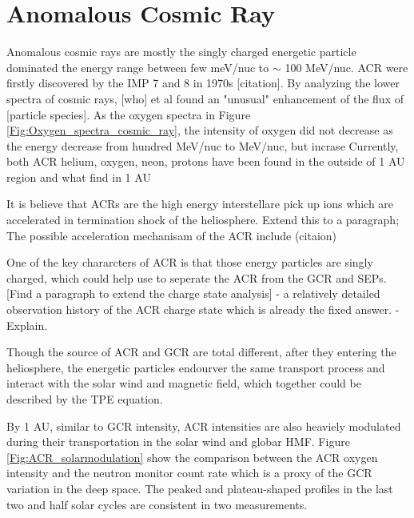 	


\section{Anomalous Cosmic Ray}

Anomalous cosmic rays are mostly the singly charged energetic particle dominated the energy range between few meV/nuc to $\sim$ 100 MeV/nuc. \acs{ACR} were firstly discovered by the \acs{IMP} 7 and 8 in 1970s [citation]. By analyzing the lower spectra of cosmic rays, [who] et al found an "unusual" enhancement of the flux of [particle species]. As the oxygen spectra in Figure \ref{Fig:Oxygen_spectra_cosmic_ray}, the intensity of oxygen did not decrease as the energy decrease from hundred MeV/nuc to MeV/nuc, but incrase
Currently, both ACR helium, oxygen, neon, protons have been found in the outside of 1 AU region and what find in 1 AU

It is believe that ACRs are the high energy interstellare pick up ions which are accelerated in termination shock of the heliosphere. Extend this to a paragraph;
The possible acceleration mechanisam of the ACR include  (citaion)

One of the key chararcters of ACR is that those energy particles are singly charged, which could help use to seperate the ACR from the GCR and SEPs. [Find a paragraph to extend the charge state analysis] - a relatively detailed observation history of the ACR charge state which is already the fixed answer. - Explain.


Though the source of ACR and GCR are total different, after they entering the heliosphere, the energetic particles endourver the same transport process and interact with the solar wind and magnetic field,  which together could be described by the TPE equation.

By 1 AU, similar to GCR intensity, ACR intensities are also heaviely modulated during their transportation in the solar wind and globar \ac{HMF}. Figure \ref{Fig:ACR_solarmodulation} show the comparison between the ACR oxygen intensity and the neutron monitor count rate which is a proxy of the GCR variation in the deep space. The peaked and plateau-shaped profiles in the last two and half solar cycles are consistent in two measurements.


